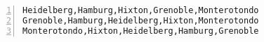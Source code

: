 \begin{lstlisting}[numbers=left]
Heidelberg,Hamburg,Hixton,Grenoble,Monterotondo
Grenoble,Hamburg,Heidelberg,Hixton,Monterotondo
Monterotondo,Hixton,Heidelberg,Hamburg,Grenoble

\end{lstlisting}